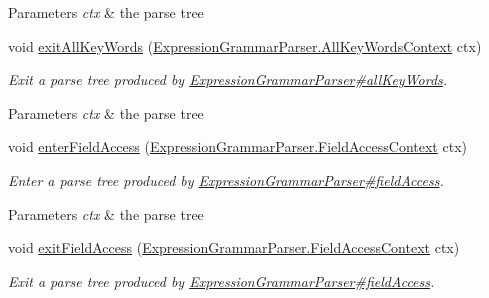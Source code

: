 \begin{DoxyCompactItemize}
\begin{DoxyCompactList}
\begin{DoxyParams}{Parameters}
{\em ctx} & the parse tree\\
\hline
\end{DoxyParams}
 \end{DoxyCompactList}\item 
void \hyperlink{classgov_1_1nasa_1_1jpf_1_1inspector_1_1server_1_1expression_1_1parser_1_1_expression_grammar_base_listener_adf4e9dbd6b9acd57f42918361c2bb4d9}{exit\+All\+Key\+Words} (\hyperlink{classgov_1_1nasa_1_1jpf_1_1inspector_1_1server_1_1expression_1_1parser_1_1_expression_grammar_parser_1_1_all_key_words_context}{Expression\+Grammar\+Parser.\+All\+Key\+Words\+Context} ctx)
\begin{DoxyCompactList}\small\item\em Exit a parse tree produced by \hyperlink{classgov_1_1nasa_1_1jpf_1_1inspector_1_1server_1_1expression_1_1parser_1_1_expression_grammar_parser_a69f20b32ba4350fe916222aa4987d304}{Expression\+Grammar\+Parser\#all\+Key\+Words}.


\begin{DoxyParams}{Parameters}
{\em ctx} & the parse tree\\
\hline
\end{DoxyParams}
 \end{DoxyCompactList}\item 
void \hyperlink{classgov_1_1nasa_1_1jpf_1_1inspector_1_1server_1_1expression_1_1parser_1_1_expression_grammar_base_listener_a9e2da7b13b5fbc4a506ae80a7d180683}{enter\+Field\+Access} (\hyperlink{classgov_1_1nasa_1_1jpf_1_1inspector_1_1server_1_1expression_1_1parser_1_1_expression_grammar_parser_1_1_field_access_context}{Expression\+Grammar\+Parser.\+Field\+Access\+Context} ctx)
\begin{DoxyCompactList}\small\item\em Enter a parse tree produced by \hyperlink{classgov_1_1nasa_1_1jpf_1_1inspector_1_1server_1_1expression_1_1parser_1_1_expression_grammar_parser_ab65b047e852d9f4863e316728b4e791a}{Expression\+Grammar\+Parser\#field\+Access}.


\begin{DoxyParams}{Parameters}
{\em ctx} & the parse tree\\
\hline
\end{DoxyParams}
 \end{DoxyCompactList}\item 
void \hyperlink{classgov_1_1nasa_1_1jpf_1_1inspector_1_1server_1_1expression_1_1parser_1_1_expression_grammar_base_listener_a28785cd157cafc4e49ca6a2f8911f367}{exit\+Field\+Access} (\hyperlink{classgov_1_1nasa_1_1jpf_1_1inspector_1_1server_1_1expression_1_1parser_1_1_expression_grammar_parser_1_1_field_access_context}{Expression\+Grammar\+Parser.\+Field\+Access\+Context} ctx)
\begin{DoxyCompactList}\small\item\em Exit a parse tree produced by \hyperlink{classgov_1_1nasa_1_1jpf_1_1inspector_1_1server_1_1expression_1_1parser_1_1_expression_grammar_parser_ab65b047e852d9f4863e316728b4e791a}{Expression\+Grammar\+Parser\#field\+Access}.



\end{DoxyCompactList}
\end{DoxyCompactItemize}
